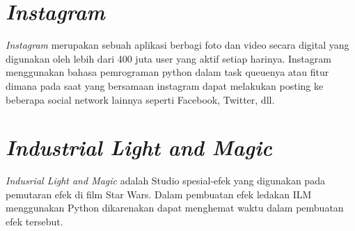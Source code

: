\section*{\textit{Instagram}}
\par
\textit{Instagram} merupakan sebuah aplikasi berbagi foto dan video secara digital yang digunakan oleh lebih dari 400 juta user yang aktif setiap harinya. Instagram menggunakan bahasa pemrograman python dalam task queuenya atau fitur dimana pada saat yang bersamaan instagram dapat melakukan posting ke beberapa social network lainnya seperti Facebook, Twitter, dll. 

\section*{\textit{Industrial Light and Magic}}
\textit{Indusrial Light and Magic} adalah Studio spesial-efek yang digunakan pada pemutaran efek di film Star Wars. Dalam pembuatan efek ledakan ILM menggunakan Python dikarenakan dapat menghemat waktu dalam pembuatan efek tersebut.   
\par


